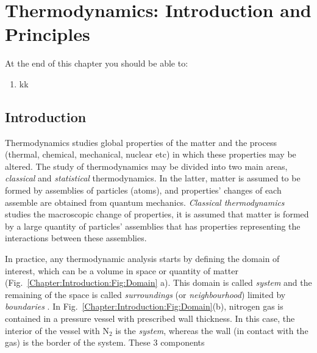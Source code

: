 
\chapter{Thermodynamics: Introduction and Principles}\label{Chapter:Introduction}
   \begin{shaded}
      \noindent
      At the end of this chapter you should be able to:
        \begin{enumerate}
           \item kk
        \end{enumerate}
   \end{shaded}

\section{Introduction}\label{Chapter:Introduction:Section:Introduction}
Thermodynamics studies global properties of the matter and the process (\eg thermal, chemical, mechanical, nuclear etc) in which these properties may be altered. The study of thermodynamics may be divided into two main areas, {\it classical} and {\it statistical} thermodynamics. In the latter, matter is assumed to be formed by assemblies of particles (\ie atoms), and properties' changes of each assemble are obtained from quantum mechanics. {\it Classical thermodynamics} studies the macroscopic change of properties, \ie it is assumed that matter is formed by a large quantity of particles' assemblies that has properties representing the interactions between these assemblies. 

In practice, any thermodynamic analysis starts by defining the domain of interest, which can be a volume in space or quantity of matter (Fig.~\ref{Chapter:Introduction:Fig:Domain} a). This domain is called {\it system} and the remaining of the space is called {\it surroundings} (or {\it neighbourhood}) limited by {\it boundaries} . In Fig.~\ref{Chapter:Introduction:Fig:Domain}(b), nitrogen gas is contained in a pressure vessel with prescribed wall thickness. In this case, the interior of the vessel with N$_{2}$ is the {\it system}, whereas the wall (in contact with the gas) is the border of the system.  These 3 components





